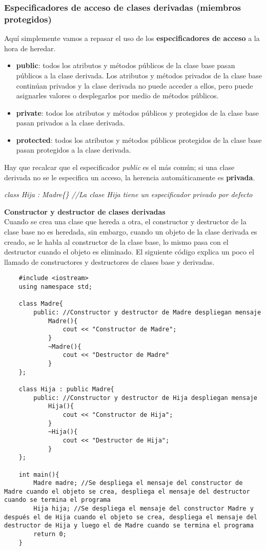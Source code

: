 \subsubsection{Especificadores de acceso de clases derivadas (miembros protegidos)}
Aquí simplemente vamos a repasar el uso de los \textbf{especificadores de acceso} a la hora de heredar.
\begin{itemize}
    \item \textbf{public}: todos los atributos y métodos públicos de la clase base pasan públicos a la clase derivada. Los atributos y métodos privados de la clase base continúan privados y la clase derivada no puede acceder a ellos, pero puede asignarles valores o desplegarlos por medio de métodos públicos.
    \item \textbf{private}: todos los atributos y métodos públicos y protegidos de la clase base pasan privados a la clase derivada.
    \item \textbf{protected}: todos los atributos y métodos públicos protegidos de la clase base pasan protegidos a la clase derivada.
\end{itemize}
Hay que recalcar que el especificador \textit{public} es el más común; si una clase derivada no se le especifica un acceso, la herencia automáticamente es \textbf{privada}.\begin{center}\textit{class Hija : Madre\{\} //La clase Hija tiene un especificador privado por defecto}\end{center}

\textbf{Constructor y destructor de clases derivadas}\\
Cuando se crea una clase que hereda a otra, el constructor y destructor de la clase base no es heredada, sin embargo, cuando un objeto de la clase derivada es creado, se le habla al constructor de la clase base, lo mismo pasa con el destructor cuando el objeto es eliminado. El siguiente código explica un poco el llamado de constructores y destructores de clases base y derivadas.
\begin{lstlisting}
    #include <iostream>
    using namespace std;
    
    class Madre{
        public: //Constructor y destructor de Madre despliegan mensaje
            Madre(){
                cout << "Constructor de Madre";
            }
            ~Madre(){
                cout << "Destructor de Madre"
            }
    };
    
    class Hija : public Madre{
        public: //Constructor y destructor de Hija despliegan mensaje
            Hija(){
                cout << "Constructor de Hija";
            }
            ~Hija(){
                cout << "Destructor de Hija";
            }
    };
    
    int main(){
        Madre madre; //Se despliega el mensaje del constructor de Madre cuando el objeto se crea, despliega el mensaje del destructor cuando se termina el programa
        Hija hija; //Se despliega el mensaje del constructor Madre y después el de Hija cuando el objeto se crea, despliega el mensaje del destructor de Hija y luego el de Madre cuando se termina el programa
        return 0;
    }
\end{lstlisting}

